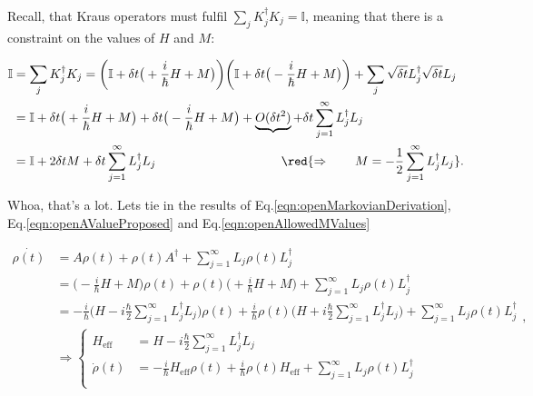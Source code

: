 \noindent Recall, that Kraus operators must fulfil $\sum_jK_j^\dagger K_j=\mathbb{I}$, meaning that there is a constraint on the values of $H$ and $M$:

\begin{equation}
\begin{aligned}
\mathbb{I} & = \sum_jK_j^\dagger K_j = \bigg(\mathbb{I} + \delta t\big(+\frac{i}{\hbar}H+M\big)\bigg)\bigg(\mathbb{I} + \delta t\big(-\frac{i}{\hbar}H+M\big)\bigg) + \sum_j\sqrt{\delta t}L_j^\dagger\sqrt{\delta t}L_j\\
& = \mathbb{I} + \delta t\big(+\frac{i}{\hbar}H+M\big) + \delta t\big(-\frac{i}{\hbar}H+M\big) + \underbrace{O(\delta t^2)} + \delta t\sum_{j=1}^{\infty}L_j^\dagger L_j\\
& = \mathbb{I} + 2\delta tM + \delta t\sum_{j=1}^{\infty}L_j^\dagger L_j \qquad \qquad \qquad \qquad \qquad \red{\Rightarrow \qquad M = -\frac{1}{2}\sum_{j=1}^{\infty}L_j^\dagger L_j}.
\end{aligned}
\label{eqn:openAllowedMValues}
\end{equation}

\noindent Whoa, that's a lot. Lets tie in the results of Eq.\eqref{eqn:openMarkovianDerivation}, Eq.\eqref{eqn:openAValueProposed} and Eq.\eqref{eqn:openAllowedMValues}

\begin{equation}
\begin{aligned}
\dot{\rho(t)} & = A\rho(t) + \rho(t)A^\dagger + \sum_{j=1}^\infty L_j\rho(t)L_j^\dagger\\
& = \bigg(-\frac{i}{\hbar}H +M\bigg)\rho(t) + \rho(t)\bigg(+\frac{i}{\hbar}H + M\bigg) + \sum_{j=1}^\infty L_j\rho(t)L_j^\dagger\\
& = -\frac{i}{\hbar}\bigg(H -i\frac{\hbar}{2}\sum_{j=1}^{\infty}L_j^\dagger L_j\bigg)\rho(t) + \frac{i}{\hbar} \rho(t)\bigg(H +i\frac{\hbar}{2}\sum_{j=1}^{\infty}L_j^\dagger L_j\bigg) + \sum_{j=1}^\infty L_j\rho(t)L_j^\dagger\\
& \Rightarrow \left\lbrace
\begin{aligned}
H_\text{eff} & = H - i\frac{\hbar}{2}\sum_{j=1}^{\infty}L_j^\dagger L_j\\
\dot{\rho}(t) & = -\frac{i}{\hbar}H_\text{eff}\rho(t) + \frac{i}{\hbar} \rho(t)H_\text{eff} + \sum_{j=1}^\infty L_j\rho(t)L_j^\dagger\\
\end{aligned}
\right.
\end{aligned},
\end{equation}

